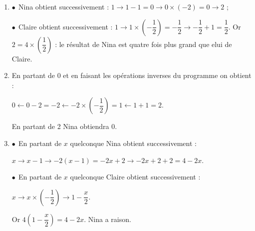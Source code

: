 
\medskip

%

\begin{enumerate}
\item %
$\bullet~~$Nina obtient successivement : $1 \to 1 - 1 = 0 \to 0 \times (- 2) = 0 \to 2$ ;

$\bullet~~$Claire obtient successivement : $1 \to 1 \times \left(- \dfrac{1}{2} \right) = - \dfrac{1}{2} \to - \dfrac{1}{2} + 1 =  \dfrac{1}{2}$.
Or $2 = 4 \times \left(\dfrac{1}{2} \right)$ : le résultat de Nina est quatre fois plus grand que elui de Claire.
\item  %
En partant de $0$ et en faisant les opérations inverses du programme on obtient :

$0 \gets 0 - 2 = - 2 \gets - 2 \times \left(- \dfrac{1}{2}\right) = 1 \gets 1 + 1 = 2$.

En partant de 2 Nina obtiendra 0.
\item  %

$\bullet~~$En partant de $x$ quelconque Nina obtient successivement :

$x \to x - 1 \to -2(x - 1) = - 2x + 2 \to - 2x + 2 + 2 = 4 - 2x$.

$\bullet~~$En partant de $x$ quelconque Claire obtient successivement :

$x \to x \times \left(- \dfrac{1}{2}\right) \to 1 - \dfrac{x}{2}$.

Or $4\left(1 - \dfrac{x}{2} \right) = 4 - 2x $. Nina a  raison.
\end{enumerate}

\bigskip

